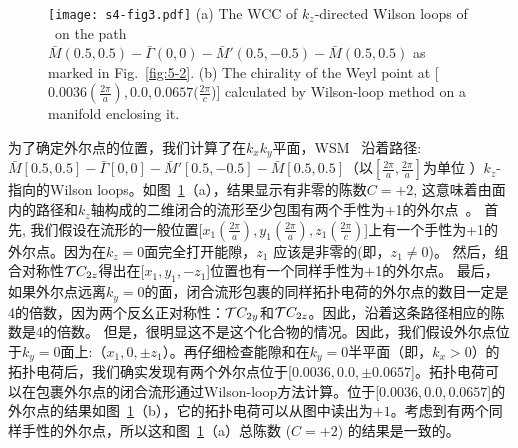 \begin{figure*}[!htb]
    \centering
    \texttt{[image: s4-fig3.pdf]}
        {
        (a) The WCC of $k_z$-directed Wilson loops of \wsmc~on the path $\bar M (0.5,0.5)-\bar \Gamma(0,0)-\bar M'(0.5,-0.5)-\bar M(0.5,0.5)$ as marked in Fig.~\ref{fig:5-2}. (b) The chirality of the Weyl point at [$0.0036(\frac{2\pi}{a}), 0.0, 0.0657(\frac{2\pi}{c}$)] calculated by Wilson-loop method on a manifold enclosing it. ~\citep{Qians4}
    } 
    \label{fig:5-3}
    \end{figure*}
为了确定外尔点的位置，我们计算了在$k_xk_y$平面，WSM \wsmc~沿着路径: $\bar M [0.5,0.5]-\bar \Gamma[0,0]-\bar M'[0.5,-0.5]-\bar M[0.5,0.5]$（以$[\frac{2\pi}{a},\frac{2\pi}{a}]$为单位 ）$k_z$-指向的Wilson loops。如图~\ref{fig:5-3}（a），结果显示有非零的陈数$C=+2$, 这意味着由面内的路径和$k_z$轴构成的二维闭合的流形至少包围有两个手性为+1的外尔点~\citep{Fang92}。
首先, 我们假设在流形的一般位置[$x_1 (\frac{2\pi}{a}),y_1 (\frac{2\pi}{a}),z_1 (\frac{2\pi}{c})$]上有一个手性为+1的外尔点。因为在$k_z=0$面完全打开能隙，$z_1$ 应该是非零的(即，$z_1\neq 0$)。
然后，组合对称性${\cal T}C_{2z}$得出在[$x_1,y_1,-z_1$]位置也有一个同样手性为+1的外尔点。
最后，如果外尔点远离$k_y=0$的面，闭合流形包裹的同样拓扑电荷的外尔点的数目一定是4的倍数，因为两个反幺正对称性：${\cal T}C_{2y}$和${\cal T}C_{2z}$。因此，沿着这条路径相应的陈数是4的倍数。
但是，很明显这不是这个化合物的情况。因此，我们假设外尔点位于$k_y=0$面上:（$x_1,0,\pm z_1$）。再仔细检查能隙和在$k_y=0$半平面（即，$k_x>0$）的拓扑电荷后，我们确实发现有两个外尔点位于[$0.0036,0.0,\pm0.0657$]。拓扑电荷可以在包裹外尔点的闭合流形通过Wilson-loop方法计算。位于[$0.0036,0.0,0.0657$]的外尔点的结果如图~\ref{fig:5-3}（b），它的拓扑电荷可以从图中读出为$+1$。考虑到有两个同样手性的外尔点，所以这和图~\ref{fig:5-3}（a）总陈数 ($C=+2$) 的结果是一致的。


